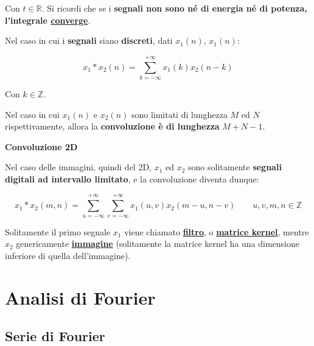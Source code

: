 \documentclass[a4paper]{article}
\begin{document}
	\noindent
	Con $t \in \mathbb{R}$. Si ricordi che se i \textbf{segnali non sono né di energia né di potenza, l'integrale \underline{converge}}.\newline
	
	\noindent
	Nel caso in cui i \textbf{segnali} siano \textbf{discreti}, dati $x_{1}\left(n\right)$, $x_{1}\left(n\right)$:
	
	\begin{equation*}
		x_{1} * x_{2} \left(n\right) = \sum_{k = -\infty}^{+\infty} x_{1}\left(k\right) x_{2}\left(n - k\right)
	\end{equation*}

	\noindent
	Con $k \in \mathbb{Z}$.
	
	\noindent
	Nel caso in cui $x_{1} \left(n\right)$ e $x_{2} \left(n\right)$ sono limitati di lunghezza $M$ ed $N$ rispettivamente, allora la \textbf{convoluzione è di lunghezza} $M+N-1$.\newline
	
	\noindent
	\textcolor{Green4}{\textbf{Convoluzione 2D}}\newline
	
	\noindent
	Nel caso delle immagini, quindi del 2D, $x_{1}$ ed $x_{2}$ sono solitamente \textbf{segnali digitali ad intervallo limitato}, e la convoluzione diventa dunque:
	
	\begin{equation*}
		x_{1} * x_{2}\left(m,n\right) = \sum_{u = -\infty}^{+\infty} \sum_{v = -\infty}^{+\infty} x_{1} \left(u,v\right) x_{2}\left(m - u, n - v\right) \hspace{2em} u,v,m,n\in\mathbb{Z}
	\end{equation*}

	\noindent
	Solitamente il primo segnale $x_{1}$ viene chiamato \textbf{\underline{filtro}}, o \textbf{\underline{matrice kernel}}, mentre $x_{2}$ genericamente \textbf{\underline{immagine}} (solitamente la matrice kernel ha una dimensione inferiore di quella dell'immagine).
	
	\newpage
	
	\section{Analisi di Fourier}
	
	\subsection{Serie di Fourier}\label{serie di fourier}
	
\end{document}
